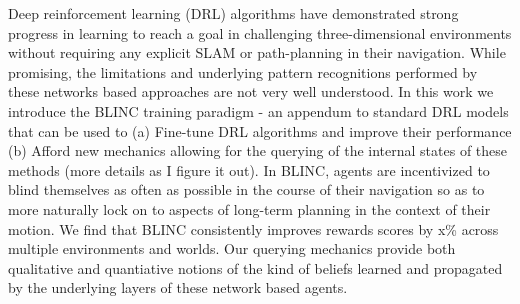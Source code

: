 Deep reinforcement learning (DRL) algorithms have demonstrated strong progress in learning to reach a goal in challenging three-dimensional environments without requiring any explicit SLAM or path-planning in their navigation. While promising, the limitations and underlying pattern recognitions performed by these networks based approaches are not very well understood. In this work we introduce the BLINC training paradigm - an appendum to standard DRL models that can be used to (a) Fine-tune DRL algorithms and improve their performance (b) Afford new mechanics allowing for the querying of the internal states of these methods (more details as I figure it out). In BLINC, agents are incentivized to blind themselves as often as possible in the course of their navigation so as to more naturally lock on to aspects of long-term planning in the context of their motion. We find that BLINC consistently improves rewards scores by x\% across multiple environments and worlds. Our querying mechanics provide both qualitative and quantiative notions of the kind of beliefs learned and propagated by the underlying layers of these network based agents. 

